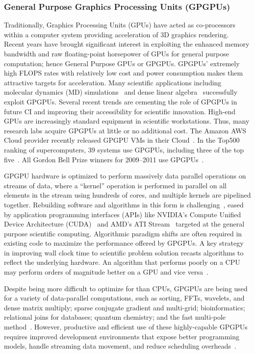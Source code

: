 \subsubsection{General Purpose Graphics Processing Units (GPGPUs)}
Traditionally, Graphics Processing Units (GPUs) have acted as co-processors within a computer
system providing acceleration of 3D graphics rendering. 
Recent years have brought significant
interest in exploiting the enhanced memory bandwidth and raw floating-point horsepower of GPUs
for general purpose computation; 
hence General Purpose GPUs or GPGPUs. GPGPUs' extremely
high FLOPS rates with relatively low cost and power consumption makes them attractive targets for
acceleration. 
Many scientific applications including molecular dynamics (MD) simulations~\cite{moleculardynamics} and
dense linear algebra~\cite{denselinearalgebra} successfully exploit GPGPUs. 
Several recent trends are cementing the
role of GPGPUs in future CI and improving their accessibility for scientific innovation. 
High-end GPUs are increasingly standard equipment in scientific workstations. 
Thus, many research labs
acquire GPGPUs at little or no additional cost. 
The Amazon AWS Cloud provider recently released
GPGPU VMs in their Cloud~\cite{AmazonGPU}. 
In the Top500 ranking of supercomputers, 39 systems use
GPGPUs, including three of the top five~\cite{top500:sc11}. 
All Gordon Bell Prize winners for 2009–2011 use 
GPGPUs~\cite{Hamada09,conf/sc/RahimianLVCMMSSVVZB10,Shimokawabe:2011:PPS:2063384.2063388}.

GPGPU hardware is optimized to perform massively data parallel operations on streams of data, where
a ``kernel'' operation is performed in parallel on all elements in the stream using hundreds of cores, and multiple kernels
are pipelined together.
Rebuilding software and algorithms in this form is
challenging~\cite{Yang2007:gpu}, eased by application
programming interfaces (APIs) like NVIDIA's Compute Unified Device
Architecture (CUDA)~\cite{NVIDIA.cuda.4} and AMD's ATI
Stream~\cite{ATI.Stream} targeted at the general purpose scientific
computing.
Algorithmic paradigm shifts are often required in existing code to
maximize the performance offered by GPGPUs.
A key strategy in improving wall clock time to scientific problem
solution recasts algorithms to reflect the underlying hardware. 
An algorithm that performs poorly on a CPU may perform orders of
magnitude better on a GPU and vice versa~\cite{Vuduc:2010kx}.

Despite being more difficult to optimize for than CPUs, GPGPUs are being
used for a variety of data-parallel computations, such as sorting, FFTs,
wavelets, and dense matrix multiply; sparse conjugate gradient and
multi-grid; bioinformatics; relational joins for databases; quantum
chemistry; and the fast multi-pole method~\cite{NVIDIA.cuda.community}.
However, productive and efficient use of these highly-capable GPGPUs
requires improved development environments that expose better
programming models, handle streaming data movement, and reduce
scheduling overheads~\cite{AugThiNamWac11CCPE}.

